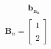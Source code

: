 \documentclass[preview]{standalone}
\begin{document}
\begin{align*}
\begin{array}{c}\begin{matrix}\hspace{1cm} \mathbf{b_{n_x}}\end{matrix} \\  \mathbf{B}_n = \begin{bmatrix} 1 \\ \\2  \end{bmatrix} \end{array}
\end{align*}
\end{document}
